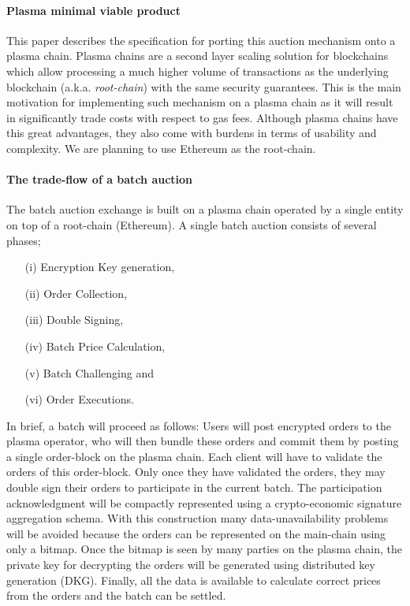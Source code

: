\documentclass[11pt,parskip=full]{scrartcl}%
\begin{document}
\paragraph{Plasma minimal viable product}

This paper describes the specification for porting this auction mechanism onto a plasma chain. Plasma chains are a second layer scaling solution for blockchains which allow processing a much higher volume of transactions as the underlying blockchain (a.k.a. \emph{root-chain}) with the same security guarantees. This is the main motivation for implementing such mechanism on a plasma chain as it will result in significantly trade costs with respect to gas fees. Although plasma chains have this great advantages, they also come with burdens in terms of usability and complexity. We are planning to use Ethereum as the root-chain. 

\paragraph{The trade-flow of a batch auction}  

The batch auction exchange is built on a plasma chain operated by a single entity on top of a root-chain (Ethereum). A single batch auction consists of several phases;
\begin{itemize}
\item[(i)] Encryption Key generation, 
\item[(ii)] Order Collection, 
\item[(iii)] Double Signing, 
\item[(iv)] Batch Price Calculation, 
\item[(v)] Batch Challenging and 
\item[(vi)] Order Executions. 
\end{itemize}
In brief, a batch will proceed as follows: Users will post encrypted orders to the plasma operator, who will then bundle these orders and commit them by posting a single order-block on the plasma chain. Each client will have to validate the orders of this order-block. Only once they have validated the orders, they may double sign their orders to participate in the current batch. The participation acknowledgment will be compactly represented using a crypto-economic signature aggregation schema. With this construction many data-unavailability problems will be avoided because the orders can be represented on the main-chain using only a bitmap.
Once the bitmap is seen by many parties on the plasma chain, the private key for decrypting the orders will be generated using distributed key generation (DKG). Finally, all the data is available to calculate correct prices from the orders and the batch can be settled. 
\end{document}
